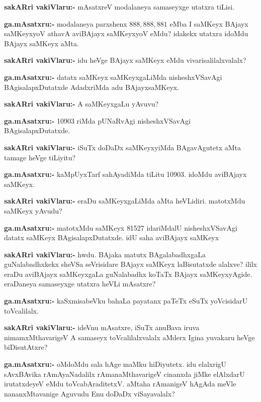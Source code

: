 \smallskip
\noindent
\textbf{sakARri vakiVlaru:-} mAsatxreV modalaneya samaseyxge utatxra tiLisi.

\smallskip
\noindent
\textbf{ga.mAsatxru:-} modalaneya parxshenx $888, 888, 881$ eMba I saMKeyx BAjayx saMKeyxyoV athavA aviBAjayx saMKeyxyoV eMdu? idakekx utatxra idoMdu BAjayx saMKeyx aMta.

\smallskip
\noindent
\textbf{sakARri vakiVlaru:-} idu heVge BAjayx saMKeyx eMdu vivarisalilalxvalalx?

\smallskip
\noindent
\textbf{ga.mAsatxru:-} datatx saMKeyx saMKeyxgaLiMda nisheshxVSavAgi BAgisalapxDutatxde AdadxriMda adu BAjayxsaMKeyx.

\smallskip
\noindent
\textbf{sakARri vakiVlaru:-} A saMKeyxgaLu yAvuvu?

\smallskip
\noindent
\textbf{ga.mAsatxru:-} {\rm 10903} riMda pUNaRvAgi nisheshxVSavAgi BAgisalapxDutatxde.

\smallskip
\noindent
\textbf{sakARri vakiVlaru:-} iSuTx doDaDx saMKeyxyiMda BAgavAgutetx aMta tamage heVge tiLiyitu?

\smallskip
\noindent
\textbf{ga.mAsatxru:-} kaMpUyxTarf sahAyadiMda tiLitu {\rm 10903.} idoMdu aviBAjayx saMKeyx.

\smallskip
\noindent
\textbf{sakARri vakiVlaru:-} eraDu saMKeyxgaLiMda aMta heVLidiri. matotxMdu saMKeyx yAvudu?

\smallskip
\noindent
\textbf{ga.mAsatxru:-} matotxMdu saMKeyx {\rm 81527} idariMdalU nisheshxVSavAgi datatx saMKeyx BAgisalapxDutatxde. idU saha aviBAjayx saMKeyx

\smallskip
\noindent
\textbf{sakARri vakiVlaru:-} hwdu. BAjaka matutx BAgalabadhxgaLa guNalabadhxkekx sheVSa seVrisidare BAjayx saMKeyx laBisutatxde alalxve? ililx eraDu aviBAjayx saMKeyxgaLa guNalabadhx koTaTx BAjayx saMKeyxyAgide. eraDaneya samaseyxge utatxra heVLi mAsatxre?

\smallskip
\noindent
\textbf{ga.mAsatxru:-} kaSxmisabeVku bahaLa payatanx paTeTx eSuTx yoVcisidarU toVcalilalx.

\smallskip
\noindent
\textbf{sakARri vakiVlaru:-} ideVnu mAsatxre, iSuTx anuBava iruva nimamxMthavarigeV A samaseyx toVcalilalxvalalx aMderx Igina yuvakaru heVge biDisutAtxre?

\smallskip
\noindent
\textbf{ga.mAsatxru:-} oMdoMdu sala hAge maMku hiDiyutetx. idu elalxrigU sAvxBAvika rAmAyaNadalilx rAmanaMthavarigeV cinanxda jiMke elAlxdarU irutatxdeyeV eMdu toVcabAraditetxV. aMtaha rAmanigeV hAgAda meVle nananxMtavanige Aguvudu Enu doDaDx viSayavalalx?

